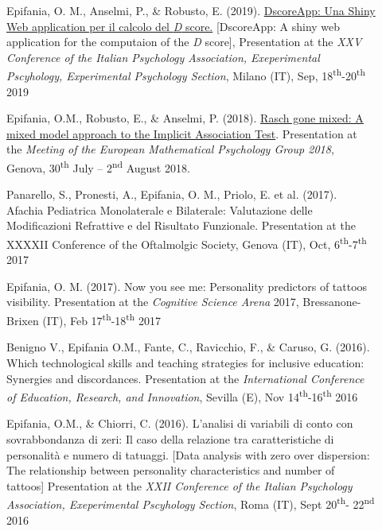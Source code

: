 \documentclass[letterpaper,12pt]{article}
\begin{document}
\begin{description}
	\item[] 	Epifania, O. M., Anselmi, P., \& Robusto, E. (2019). \href{https://ottaviae.github.io/presentations/2019/aip_slides.html#1}{DscoreApp: Una Shiny Web application per il calcolo del \emph{D} score.}  [DscoreApp: A shiny web application for the computaion of the \emph{D} score], Presentation at the \emph{XXV Conference of the Italian Psychology Association, Exeperimental Pscyhology, Experimental Psychology Section}, Milano (IT), Sep, 18\textsuperscript{th}-20\textsuperscript{th} 2019
	
	\item[] 	Epifania, O.M., Robusto, E., \& Anselmi, P. (2018). \href{https://ottaviae.github.io/presentations/2018/empg2018.pdf}{Rasch gone mixed: A mixed model approach to the Implicit Association Test}. Presentation at the \emph{Meeting of the European Mathematical Psychology Group 2018}, Genova, 30\textsuperscript{th} July – 2\textsuperscript{nd} August 2018.
	
	\item[] 	Panarello, S., Pronesti, A., Epifania, O. M., Priolo, E. et al. (2017). Afachia Pediatrica Monolaterale e Bilaterale: Valutazione delle Modificazioni Refrattive e del Risultato Funzionale. Presentation at the XXXXII Conference of the Oftalmolgic Society, Genova (IT), Oct, 6\textsuperscript{th}-7\textsuperscript{th} 2017
	
	\item[] 	Epifania, O. M. (2017). Now you see me: Personality predictors of tattoos visibility. Presentation at the \emph{Cognitive Science Arena} 2017, Bressanone-Brixen (IT), Feb 17\textsuperscript{th}-18\textsuperscript{th} 2017
	
	\item[] 	Benigno V., Epifania O.M., Fante, C., Ravicchio, F., \& Caruso, G. (2016). Which technological skills and teaching strategies for inclusive education: Synergies and discordances. Presentation at the \emph{International Conference of Education, Research, and Innovation}, Sevilla (E), Nov  14\textsuperscript{th}-16\textsuperscript{th} 2016
	
	\item[] 	Epifania, O.M., \& Chiorri, C. (2016). L’analisi di variabili di conto con sovrabbondanza di zeri: Il caso della relazione tra caratteristiche di personalità e numero di tatuaggi. [Data analysis with zero over dispersion: The relationship between personality characteristics and number of tattoos] Presentation at the \emph{XXII Conference of the Italian Psychology Association, Exeperimental Pscyhology Section}, Roma (IT), Sept 20\textsuperscript{th}- 22\textsuperscript{nd} 2016
	
\end{description}
\end{document}
